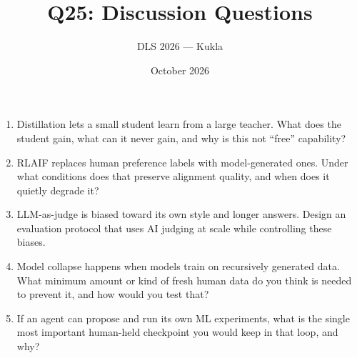 \documentclass[11pt]{article}
\title{Q25: Discussion Questions}
\author{DLS 2026 --- Kukla}
\date{October 2026}
\begin{document}
\maketitle
\begin{enumerate}[leftmargin=1.5em]
\item Distillation lets a small student learn from a large teacher. What does the student gain, what can it never gain, and why is this not ``free'' capability?
\item RLAIF replaces human preference labels with model-generated ones. Under what conditions does that preserve alignment quality, and when does it quietly degrade it?
\item LLM-as-judge is biased toward its own style and longer answers. Design an evaluation protocol that uses AI judging at scale while controlling these biases.
\item Model collapse happens when models train on recursively generated data. What minimum amount or kind of fresh human data do you think is needed to prevent it, and how would you test that?
\item If an agent can propose and run its own ML experiments, what is the single most important human-held checkpoint you would keep in that loop, and why?
\end{enumerate}
\end{document}
